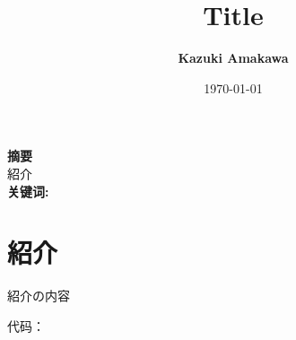 \documentclass[UTF8]{ctexart}
\title{Title}
\author{\textbf{Kazuki Amakawa}}
\date{\today}
\theoremstyle{plain}
\begin{document}
\maketitle
\noindent \textbf{摘要}\\
紹介\\

\noindent \textbf{关键词:} \\[20ex]
\thispagestyle{empty}
\newpage
\tableofcontents
\thispagestyle{empty}
\newpage
\setcounter{page}{1}
\newpage
\section{紹介}
紹介の内容



\newpage
\medskip



\noindent 代码：\texttt{$$}\\
\end{document}

